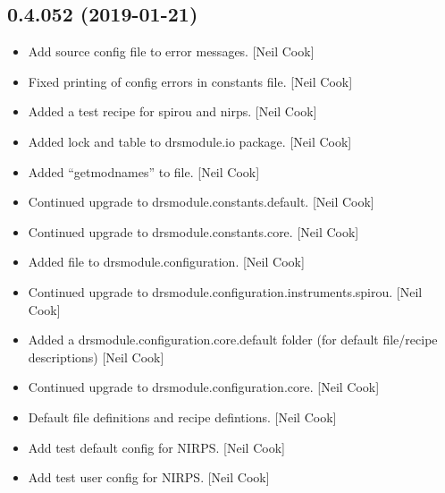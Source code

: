 \documentclass[a4paper,10pt,english]{report}
\begin{document}
\subsection{0.4.052 (2019-01-21)}
\label{\detokenize{misc/changelog:id212}}\begin{itemize}
\item {} 
Add source config file to error messages. {[}Neil Cook{]}

\item {} 
Fixed printing of config errors in constants file. {[}Neil Cook{]}

\item {} 
Added a test recipe for spirou and nirps. {[}Neil Cook{]}

\item {} 
Added lock and table to drsmodule.io package. {[}Neil Cook{]}

\item {} 
Added “getmodnames” to  file. {[}Neil Cook{]}

\item {} 
Continued upgrade to drsmodule.constants.default. {[}Neil Cook{]}

\item {} 
Continued upgrade to drsmodule.constants.core. {[}Neil Cook{]}

\item {} 
Added  file to drsmodule.configuration. {[}Neil Cook{]}

\item {} 
Continued upgrade to drsmodule.configuration.instruments.spirou. {[}Neil
Cook{]}

\item {} 
Added a drsmodule.configuration.core.default folder (for default
file/recipe descriptions) {[}Neil Cook{]}

\item {} 
Continued upgrade to drsmodule.configuration.core. {[}Neil Cook{]}

\item {} 
Default file definitions and recipe defintions. {[}Neil Cook{]}

\item {} 
Add test default config for NIRPS. {[}Neil Cook{]}

\item {} 
Add test user config for NIRPS. {[}Neil Cook{]}

\end{itemize}
\end{document}
